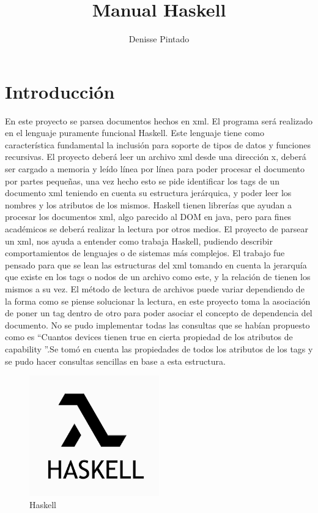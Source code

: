 \documentclass[12pt,oneside]{book}
\title{Manual Haskell }
\author{Denisse Pintado}
\begin{document}
\maketitle
\tableofcontents

\chapter{Introducción}
En este proyecto se parsea documentos hechos en xml. El programa será realizado en el lenguaje puramente funcional Haskell. Este lenguaje tiene como característica fundamental la inclusión para soporte de tipos de datos y funciones recursivas. El proyecto deberá leer un archivo xml desde una dirección x, deberá ser cargado a memoria y leído línea por línea para poder procesar el documento por partes pequeñas, una vez hecho esto se pide identificar los tags de un documento xml teniendo en cuenta su estructura jerárquica, y poder leer los nombres y los atributos de los mismos. Haskell tienen librerías que ayudan a procesar los documentos xml, algo parecido al DOM en java, pero para fines académicos se deberá realizar la lectura por otros medios.
 \newpage
El proyecto de parsear un xml, nos ayuda a entender como trabaja Haskell, pudiendo describir comportamientos de lenguajes o de sistemas más complejos. El trabajo fue pensado para que se lean las estructuras del xml tomando en cuenta la jerarquía que existe en los tags o nodos de un archivo como este, y la relación de tienen los mismos a su vez. El método de lectura de archivos puede variar dependiendo de la forma como se piense solucionar la lectura, en este proyecto toma la asociación de poner un tag dentro de otro para  poder asociar el concepto de dependencia del documento. No se pudo implementar todas las consultas que se habían propuesto como es “Cuantos devices tienen true en cierta propiedad de los atributos de capability ”.Se tomó en cuenta las propiedades de todos los atributos de los tags y se pudo hacer consultas sencillas en base a esta estructura.

\begin{figure}
  \centering
    \includegraphics[width=0.5\textwidth]{logohaskell.png}
  \caption{Haskell}
  \label{fig:logohaskell}
\end{figure}
\end{document}
